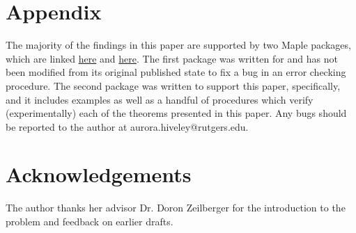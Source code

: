 \documentclass[article]{amsart}
\theoremstyle{plain}
\begin{document}
\section*{Appendix} \label{sec:appen}
The majority of the findings in this paper are supported by two Maple packages, which are linked \href{https://aurorahiveley.github.io/wordle.txt}{here} and \href{https://aurorahiveley.github.io/wordlerep.txt}{here}. The first package was written for \cite{hiveley2025} and has not been modified from its original published state to fix a bug in an error checking procedure. The second package was written to support this paper, specifically, and it includes examples as well as a handful of procedures which verify (experimentally) each of the theorems presented in this paper. Any bugs should be reported to the author at aurora.hiveley@rutgers.edu.


\section*{Acknowledgements}
The author thanks her advisor Dr. Doron Zeilberger for the introduction to the problem and feedback on earlier drafts. 




\end{document}
